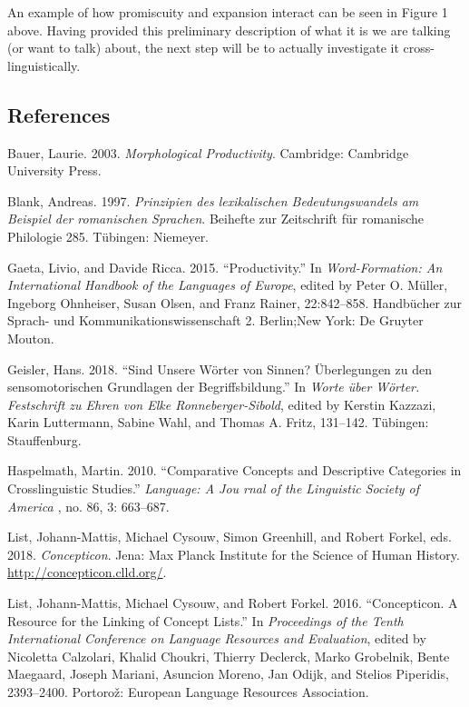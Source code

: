 \documentclass[
  a4paper,
  14pt,
  oneside,
  tablecaptionabove
]{scrbook}
\begin{document}
An example of how
promiscuity and expansion interact can be seen in Figure 1 above. Having
provided this preliminary description of what it is we are talking (or
want to talk) about, the next step will be to actually investigate it
cross-linguistically.

\subsection*{References}

\nopagebreak\hangindent=0.7cm {\small Bauer, Laurie. 2003. \emph{Morphological Productivity}.  Cambridge:
Cambridge University Press. }

\nopagebreak\hangindent=0.7cm {\small Blank, Andreas. 1997. \emph{Prinzipien des lexikalischen
Bedeutungswandels am Beispiel der romanischen Sprachen}.  Beihefte zur
Zeitschrift für romanische Philologie 285. Tübingen: Niemeyer. }

\nopagebreak\hangindent=0.7cm {\small Gaeta, Livio, and Davide Ricca. 2015. \enquote{Productivity.} In
\emph{Word-Formation: An International Handbook of the Languages of
Europe}, edited by Peter O. Müller, Ingeborg Ohnheiser, Susan Olsen,
and Franz Rainer, 22:842--858. Handbücher zur Sprach- und
Kommunikationswissenschaft 2. Berlin;New York: De Gruyter Mouton. }

\nopagebreak\hangindent=0.7cm {\small Geisler, Hans. 2018. \enquote{Sind Unsere Wörter von Sinnen?
Überlegungen zu den sensomotorischen Grundlagen der Begriffsbildung.} In
\emph{Worte über Wörter. Festschrift zu Ehren von Elke
Ronneberger-Sibold}, edited by Kerstin Kazzazi, Karin Luttermann,
Sabine Wahl, and Thomas A. Fritz, 131--142. Tübingen: Stauffenburg. }

\nopagebreak\hangindent=0.7cm {\small Haspelmath, Martin. 2010. \enquote{Comparative Concepts and
Descriptive Categories in Crosslinguistic Studies.} \emph{Language: A
Jou { rnal of the Linguistic Society of America }}, no. 86, 3:
663--687. }

\nopagebreak\hangindent=0.7cm {\small List, Johann-Mattis, Michael Cysouw, Simon Greenhill, and Robert
Forkel, eds. 2018. \emph{Concepticon}.  Jena: Max Planck Institute for
the Science of Human History. \url{http://concepticon.clld.org/}.  }

\nopagebreak\hangindent=0.7cm {\small List, Johann-Mattis, Michael Cysouw, and Robert Forkel. 2016.
\enquote{Concepticon. A Resource for the Linking of Concept Lists.} In
\emph{Proceedings of the Tenth International Conference on Language
Resources and Evaluation}, edited by Nicoletta Calzolari, Khalid
Choukri, Thierry Declerck, Marko Grobelnik, Bente Maegaard, Joseph
Mariani, Asuncion Moreno, Jan Odijk, and Stelios Piperidis, 2393--2400.
Portorož: European Language Resources Association. }
\end{document}
